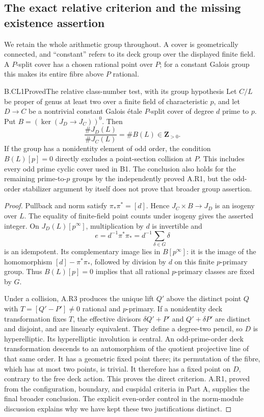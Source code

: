 \subsection{The exact relative criterion and the missing existence assertion}

We retain the whole arithmetic group throughout. A cover is
geometrically connected, and ``constant'' refers to its deck group
over the displayed finite field. A $P$-split cover has a chosen rational
point over $P$; for a constant Galois group this makes its entire fibre
above $P$ rational.

\begin{claim}{B.CL1}{Proved}{The relative class-number test, with its group hypothesis}
Let $C/L$ be proper of genus at least two over a finite field of
characteristic $p$, and let $D\to C$ be a nontrivial constant Galois
\'etale $P$-split cover of degree $d$ prime to $p$. Put
$B=(\ker(J_D\to J_C))^0$. Then
\[
 \frac{\#J_D(L)}{\#J_C(L)}=\#B(L)\in\mathbf Z_{>0}.
\]
If the group has a nonidentity element of odd order, the condition
$B(L)[p]=0$ directly excludes a point-section collision at $P$.
This includes every odd prime cyclic cover used in B1.
The conclusion also holds for the remaining prime-to-$p$ groups
by the independently proved A.R1, but the odd-order stabilizer
argument by itself does not prove that broader group assertion.
\end{claim}
\begin{proof}
Pullback and norm satisfy $\pi_*\pi^*=[d]$. Hence
$J_C\times B\to J_D$ is an isogeny over $L$. The equality of
finite-field point counts under isogeny gives the asserted integer.
On $J_D(L)[p^\infty]$, multiplication by $d$ is invertible and
\[
 e=d^{-1}\pi^*\pi_*=d^{-1}\sum_{\delta\in G}\delta
\]
is an idempotent. Its complementary image lies in $B[p^\infty]$:
it is the image of the homomorphism $[d]-\pi^*\pi_*$, followed
by division by $d$ on this finite $p$-primary group. Thus
$B(L)[p]=0$ implies that all rational $p$-primary classes are
fixed by $G$.

Under a collision, A.R3 produces the unique lift $Q'$ above the
distinct point $Q$ with $T=[Q'-P']\ne0$ rational and $p$-primary.
If a nonidentity deck transformation fixes $T$, the effective
divisors $\delta Q'+P'$ and $Q'+\delta P'$ are distinct and
disjoint, and are linearly equivalent. They define a degree-two
pencil, so $D$ is hyperelliptic. Its hyperelliptic involution is
central. An odd-prime-order deck transformation descends to an
automorphism of the quotient projective line of that same order.
It has a geometric fixed point there; its permutation of the fibre,
which has at most two points, is trivial. It therefore has a fixed
point on $D$, contrary to the free deck action. This proves the
direct criterion. A.R1, proved from the configuration, boundary,
and cuspidal criteria in Part A, supplies the final broader conclusion.
The explicit even-order control in the norm-module discussion
explains why we have kept these two justifications distinct.
\end{proof}

